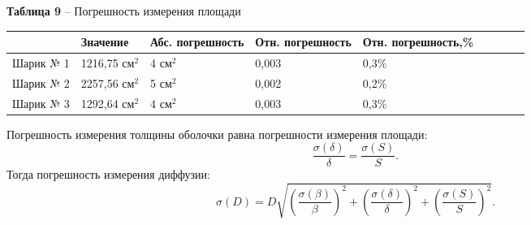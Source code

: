 \documentclass[12pt,a4paper]{article}
\begin{document}
            \begin{table}[!h]
            \begin{flushleft}
                \hspace{10}\textbf{Таблица 9} -- Погрешность измерения площади \\
                \end{flushleft}
                    \begin{center}
                        \begin{tabular}{ | l | l | l | l | l | l | l | l | l |}
                        \hline
                                    &   Значение    &   Абс. погрешность    &   Отн. погрешность    &   Отн. погрешность,\% \\
                        \hline
                        Шарик № 1   & 1216,75 см$^2$&   4   см$^2$          &   0,003               &   0,3\%               \\
                        \hline
                        Шарик № 2   & 2257,56 см$^2$&  5   см$^2$          &   0,002               &   0,2\%               \\
                        \hline
                        Шарик № 3   & 1292,64 см$^2$&  4   см$^2$          &   0,003               &   0,3\%               \\
                        \hline
                        \end{tabular}
                    \end{center}
                \end{table}  
                
            Погрешность измерения толщины оболочки равна погрешности измерения площади:
            \[
            \frac{\sigma(\delta)}{\delta} = \frac{\sigma(S)}{S}.
            \]
            Тогда погрешность измерения диффузии:
            \[
            \sigma(D) = D \sqrt{(\frac{\sigma(\beta)}{\beta})^2 + (\frac{\sigma(\delta)}{\delta})^2 + (\frac{\sigma(S)}{S})^2}.
\]
            
\end{document}

